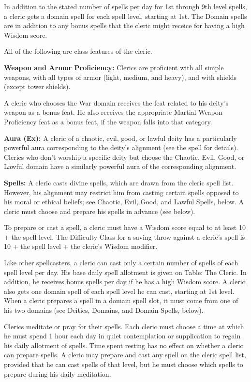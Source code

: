 In addition to the stated number of spells per day for 1st through 9th level spells, a cleric gets a domain spell for each spell level, starting at 1st. The Domain spells are in addition to any bonus spells that the cleric might receice for having a high Wisdom score.

\ClassFeatures

All of the following are class features of the cleric.

\textbf{Weapon and Armor Proficiency:} Clerics are proficient with all simple weapons, 
with all types of armor (light, medium, and heavy), and with shields (except tower 
shields).

A cleric who chooses the War domain receives the  feat related to his 
deity's weapon as a bonus feat. He also receives the appropriate Martial Weapon 
Proficiency feat as a bonus feat, if the weapon falls into that category.

\textbf{Aura (Ex):} A cleric of a chaotic, evil, good, or lawful deity has a particularly 
powerful aura corresponding to the deity's alignment (see the 
spell for details). Clerics who don't worship a specific deity but choose the 
Chaotic, Evil, Good, or Lawful domain have a similarly powerful aura of the corresponding 
alignment.

\textbf{Spells:} A cleric casts divine spells, which are drawn from the cleric 
spell list. However, his alignment may restrict him from casting certain spells 
opposed to his moral or ethical beliefs; see Chaotic, Evil, Good, and Lawful Spells, 
below. A cleric must choose and prepare his spells in advance (see below).

To prepare or cast a spell, a cleric must have a Wisdom score equal to at least 
10 + the spell level. The Difficulty Class for a saving throw against a cleric's 
spell is 10 + the spell level + the cleric's Wisdom modifier.

Like other spellcasters, a cleric can cast only a certain number of spells of each 
spell level per day. His base daily spell allotment is given on Table: The Cleric. 
In addition, he receives bonus spells per day if he has a high Wisdom score. A 
cleric also gets one domain spell of each spell level he can cast, starting at 
1st level. When a cleric prepares a spell in a domain spell slot, it must come 
from one of his two domains (see Deities, Domains, and Domain Spells, below).

Clerics meditate or pray for their spells. Each cleric must choose a time at which 
he must spend 1 hour each day in quiet contemplation or supplication to regain 
his daily allotment of spells. Time spent resting has no effect on whether a cleric 
can prepare spells. A cleric may prepare and cast any spell on the cleric spell 
list, provided that he can cast spells of that level, but he must choose which 
spells to prepare during his daily meditation.

